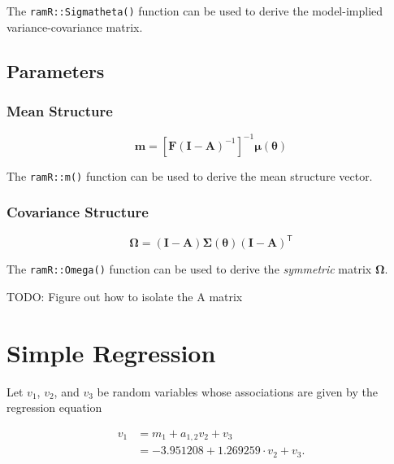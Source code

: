 \documentclass[
]{book}
\begin{document}
\noindent The \texttt{ramR::Sigmatheta()} function can be used
to derive the model-implied variance-covariance matrix.

\hypertarget{parameters}{%
\section{Parameters}\label{parameters}}

\hypertarget{mean-structure}{%
\subsection{Mean Structure}\label{mean-structure}}

\begin{equation}
  \mathbf{m}
  =
  \left[
    \mathbf{F}
    \left( \mathbf{I} - \mathbf{A} \right)^{-1}
  \right]^{-1}
  \boldsymbol{\mu} \left( \boldsymbol{\theta} \right)
\end{equation}

\noindent The \texttt{ramR::m()} function can be used
to derive the mean structure vector.

\hypertarget{covariance-structure}{%
\subsection{Covariance Structure}\label{covariance-structure}}

\begin{equation}
  \boldsymbol{\Omega}
  =
  \left( \mathbf{I} - \mathbf{A} \right)
  \boldsymbol{\Sigma} \left( \boldsymbol{\theta} \right)
  \left( \mathbf{I} - \mathbf{A} \right)^{\mathsf{T}}
\end{equation}

\noindent The \texttt{ramR::Omega()} function can be used
to derive the \emph{symmetric} matrix \(\boldsymbol{\Omega}\).

TODO: Figure out how to isolate the A matrix

\hypertarget{simple-regression}{%
\chapter{Simple Regression}\label{simple-regression}}

Let \(v_1\), \(v_2\), and \(v_3\) be random variables whose associations are given by the regression equation

\begin{equation}
  \begin{split}
    v_1
    &=
    m_1 + a_{1, 2} v_2 + v_3 \\
    &=
    -3.951208 + 1.269259 \cdot v_2 + v_3 .
  \end{split}
\end{equation}
\end{document}

